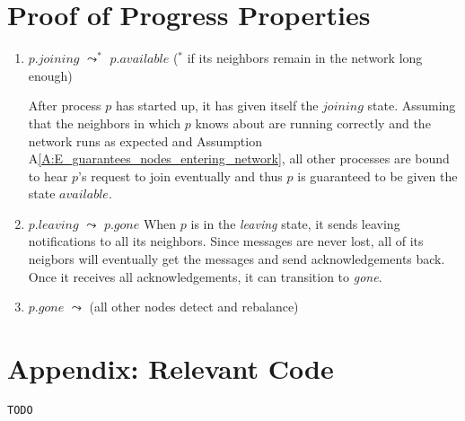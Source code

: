 \documentclass[11pt]{article}
\begin{document}
\section{Proof of Progress Properties}
\begin{enumerate}[PG1]
\item
$p.joining$ $\leadsto^*$ $p.available$ ($^*$ if its neighbors remain in the network long enough) 

\indent After process $p$ has started up, it has given itself the $joining$ state. Assuming that the neighbors in which $p$ knows about are running correctly and the network runs as expected and Assumption A\ref{A:E_guarantees_nodes_entering_network}, all other processes are bound to hear $p$'s request to join eventually and thus $p$ is guaranteed to be given the state $available$.

\item 
$p.leaving$ $\leadsto$ $p.gone$
When $p$ is in the \emph{leaving} state, it sends leaving notifications to all its neighbors. Since messages are never lost, all of its neigbors will eventually get the messages and send acknowledgements back. Once it receives all acknowledgements, it can transition to \emph{gone}.

\item 
$p.gone$ $\leadsto$ (all other nodes detect and rebalance)

\end{enumerate}

\section{Appendix: Relevant Code}
\begin{lstlisting}
TODO
\end{lstlisting}
\end{document}
